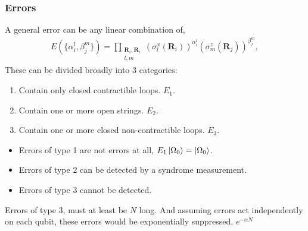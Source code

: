 \documentclass{beamer}
\renewcommand{\(}{\left(}
\renewcommand{\)}{\right)}
\renewcommand{\[}{\left[}
\renewcommand{\]}{\right]}
\begin{document}
\begin{frame}
    \frametitle{Errors}
    A general error can be any linear combination of,
    \begin{align*}
        E(\{\alpha^{l}_i, \beta^{m}_j\}) = \prod_{\substack{\bm R_i, \bm R_i\\ l, m}} (\sigma^x_l(\bm R_i))^{\alpha^{l}_i} (\sigma^z_m(\bm R_j))^{\beta^m_j},
    \end{align*}
    \pause
    These can be divided broadly into 3 categories: 
    \begin{enumerate}
        \item Contain only closed contractible loops. $E_1$.
        \item Contain one or more open strings. $E_2$.
        \item Contain one or more closed non-contractible loops. $E_3$.
    \end{enumerate}
    \pause
    \begin{itemize}
        \item Errors of type 1 are not errors at all, $E_1\ket{\Omega_0} = \ket{\Omega_0}$.
        \item Errors of type 2 can be detected by a syndrome measurement. 
        \item Errors of type 3 cannot be detected. 
    \end{itemize}
    \pause
    \begin{framed}
        Errors of type 3, must at least be $N$ long. And assuming errors act independently on each qubit, these errors would be exponentially suppressed, $e^{-\alpha N}$
    \end{framed}
\end{frame}
\end{document}
